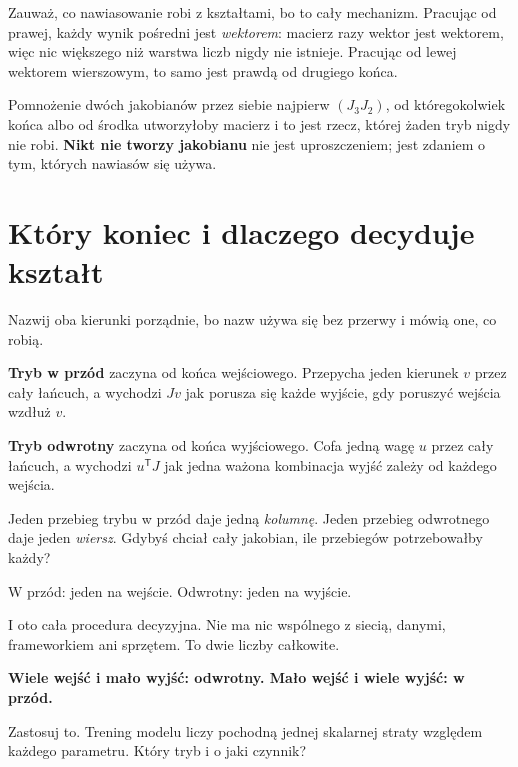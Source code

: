 \begin{fr}
\begin{note}
Zauważ, co nawiasowanie robi z kształtami, bo to cały mechanizm. Pracując od
prawej, każdy wynik pośredni jest \emph{wektorem}: macierz razy wektor jest
wektorem, więc nic większego niż warstwa liczb nigdy nie istnieje. Pracując od
lewej wektorem wierszowym, to samo jest prawdą od drugiego końca.

Pomnożenie dwóch jakobianów przez siebie najpierw \dash{} $(J_3J_2)$, od
któregokolwiek końca albo od środka \dash{} utworzyłoby macierz i to jest
rzecz, której żaden tryb nigdy nie robi. \textbf{Nikt nie tworzy jakobianu}
nie jest uproszczeniem; jest zdaniem o tym, których nawiasów się używa.
\end{note}
\end{fr}

\section{Który koniec i dlaczego decyduje kształt}
\label{sec:P16-modes}

\begin{fr}
Nazwij oba kierunki porządnie, bo nazw używa się bez przerwy i mówią one, co
robią.

\textbf{Tryb w przód} zaczyna od końca wejściowego. Przepycha jeden kierunek
$v$ przez cały łańcuch, a wychodzi $Jv$ \dash{} jak porusza się każde wyjście,
gdy poruszyć wejścia wzdłuż $v$.

\textbf{Tryb odwrotny} zaczyna od końca wyjściowego. Cofa jedną wagę $u$ przez
cały łańcuch, a wychodzi $u^{\mathsf{T}}J$ \dash{} jak jedna ważona kombinacja
wyjść zależy od każdego wejścia.

Jeden przebieg trybu w przód daje jedną \emph{kolumnę}. Jeden przebieg
odwrotnego daje jeden \emph{wiersz}. Gdybyś chciał cały jakobian, ile
przebiegów potrzebowałby każdy?
\dotline
\nextframe
\end{fr}

\begin{fr}
\begin{ansblock}
W przód: jeden na wejście. Odwrotny: jeden na wyjście.
\end{ansblock}

I oto cała procedura decyzyjna. Nie ma nic wspólnego z siecią, danymi,
frameworkiem ani sprzętem. To dwie liczby całkowite.

\textbf{Wiele wejść i mało wyjść: odwrotny. Mało wejść i wiele wyjść: w
przód.}

Zastosuj to. Trening modelu liczy pochodną jednej skalarnej straty względem
każdego parametru. Który tryb i o jaki czynnik?
\nextframe
\end{fr}

